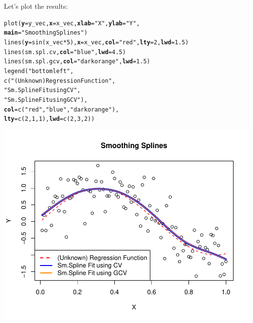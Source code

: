 \documentclass[14pt]{extreport}\usepackage[]{graphicx}\usepackage[]{xcolor}
\makeatletter
\def\maxwidth{ %
  \ifdim\Gin@nat@width>\linewidth
    \linewidth
  \else
    \Gin@nat@width
  \fi
}
\newcommand{\hlnum}[1]{\textcolor[rgb]{0.69,0.494,0}{#1}}%
\newcommand{\hlstr}[1]{\textcolor[rgb]{0.749,0.012,0.012}{#1}}%
\newcommand{\hlopt}[1]{\textcolor[rgb]{0,0,0}{#1}}%
\newcommand{\hlstd}[1]{\textcolor[rgb]{0,0,0}{#1}}%
\newcommand{\hlkwc}[1]{\textcolor[rgb]{0,0,0}{\textbf{#1}}}%
\newcommand{\hlkwd}[1]{\textcolor[rgb]{0.004,0.004,0.506}{#1}}%
\newenvironment{kframe}{%
 \def\at@end@of@kframe{}%
 \ifinner\ifhmode%
  \def\at@end@of@kframe{\end{minipage}}%
  \begin{minipage}{\columnwidth}%
 \fi\fi%
 \def\FrameCommand##1{\hskip\@totalleftmargin \hskip-\fboxsep
 \colorbox{shadecolor}{##1}\hskip-\fboxsep
     \hskip-\linewidth \hskip-\@totalleftmargin \hskip\columnwidth}%
 \MakeFramed {\advance\hsize-\width
   \@totalleftmargin\z@ \linewidth\hsize
   \@setminipage}}%
 {\par\unskip\endMakeFramed%
 \at@end@of@kframe}
\newenvironment{knitrout}{}{} %
\makeatother
\begin{document}
Let's plot the results:
\begin{knitrout}
\color{fgcolor}\begin{kframe}
\begin{alltt}
\hlkwd{plot}\hlstd{(}\hlkwc{y}\hlstd{=y_vec,} \hlkwc{x}\hlstd{=x_vec,} \hlkwc{xlab}\hlstd{=}\hlstr{"X"}\hlstd{,} \hlkwc{ylab}\hlstd{=}\hlstr{"Y"}\hlstd{,}
    \hlkwc{main}\hlstd{=}\hlstr{"Smoothing Splines"}\hlstd{)}
\hlkwd{lines}\hlstd{(}\hlkwc{y}\hlstd{=}\hlkwd{sin}\hlstd{(x_vec} \hlopt{*} \hlnum{5}\hlstd{),} \hlkwc{x}\hlstd{=x_vec,} \hlkwc{col}\hlstd{=}\hlstr{"red"}\hlstd{,} \hlkwc{lty}\hlstd{=}\hlnum{2}\hlstd{,} \hlkwc{lwd}\hlstd{=}\hlnum{1.5}\hlstd{)}
\hlkwd{lines}\hlstd{(sm.spl.cv,}  \hlkwc{col}\hlstd{=}\hlstr{"blue"}\hlstd{,}       \hlkwc{lwd}\hlstd{=}\hlnum{4.5}\hlstd{)}
\hlkwd{lines}\hlstd{(sm.spl.gcv,} \hlkwc{col}\hlstd{=}\hlstr{"darkorange"}\hlstd{,} \hlkwc{lwd}\hlstd{=}\hlnum{1.5}\hlstd{)}
\hlkwd{legend}\hlstd{(}\hlstr{"bottomleft"}\hlstd{,}
      \hlkwd{c}\hlstd{(}\hlstr{"(Unknown) Regression Function"}\hlstd{,}
        \hlstr{"Sm.Spline Fit using CV"}\hlstd{,}
        \hlstr{"Sm.Spline Fit using GCV"}\hlstd{),}
      \hlkwc{col}\hlstd{=}\hlkwd{c}\hlstd{(}\hlstr{"red"}\hlstd{,}\hlstr{"blue"}\hlstd{,} \hlstr{"darkorange"}\hlstd{),}
      \hlkwc{lty}\hlstd{=}\hlkwd{c}\hlstd{(}\hlnum{2}\hlstd{,}\hlnum{1}\hlstd{,}\hlnum{1}\hlstd{),} \hlkwc{lwd}\hlstd{=}\hlkwd{c}\hlstd{(}\hlnum{2}\hlstd{,}\hlnum{3}\hlstd{,}\hlnum{2}\hlstd{))}
\end{alltt}
\end{kframe}

{\centering \includegraphics[width=\maxwidth]{figure/unnamed-chunk-19-1} 

}


\end{knitrout}
\end{document}
